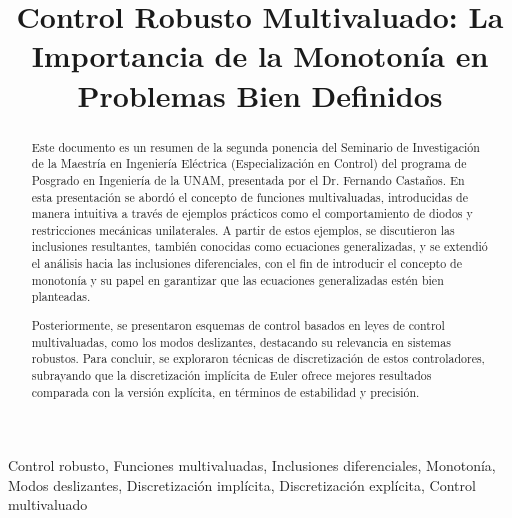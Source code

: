 \documentclass[conference]{IEEEtran}
\begin{document}
\title{Control Robusto Multivaluado: La Importancia de la Monotonía en Problemas Bien Definidos\\
}

\author{
	\and
}

\maketitle

\begin{abstract}
	Este documento es un resumen de la segunda ponencia del Seminario de Investigación de la Maestría en Ingeniería Eléctrica (Especialización en Control) del programa de Posgrado en Ingeniería de la UNAM, presentada por el Dr. Fernando Castaños. En esta presentación se abordó el concepto de funciones multivaluadas, introducidas de manera intuitiva a través de ejemplos prácticos como el comportamiento de diodos y restricciones mecánicas unilaterales. A partir de estos ejemplos, se discutieron las inclusiones resultantes, también conocidas como ecuaciones generalizadas, y se extendió el análisis hacia las inclusiones diferenciales, con el fin de introducir el concepto de monotonía y su papel en garantizar que las ecuaciones generalizadas estén bien planteadas.

	Posteriormente, se presentaron esquemas de control basados en leyes de control multivaluadas, como los modos deslizantes, destacando su relevancia en sistemas robustos. Para concluir, se exploraron técnicas de discretización de estos controladores, subrayando que la discretización implícita de Euler ofrece mejores resultados comparada con la versión explícita, en términos de estabilidad y precisión.
\end{abstract}

\begin{IEEEkeywords}
	Control robusto, Funciones multivaluadas, Inclusiones diferenciales, Monotonía, Modos deslizantes, Discretización implícita, Discretización explícita, Control multivaluado
\end{IEEEkeywords}
\end{document}
